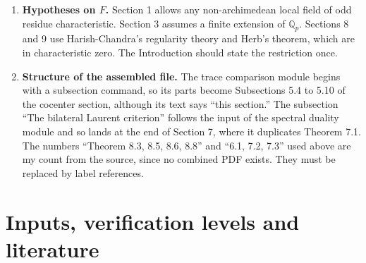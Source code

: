 \documentclass[12pt,letterpaper]{amsart}
\numberwithin{equation}{section}
\theoremstyle{definition}
\theoremstyle{remark}
\begin{document}
\begin{enumerate}[leftmargin=*]
\item \textbf{Hypotheses on $F$.} Section 1 allows any non-archimedean local field of odd residue characteristic. Section 3 assumes a finite extension of $\mathbb Q_p$. Sections 8 and 9 use Harish-Chandra's regularity theory and Herb's theorem, which are in characteristic zero. The Introduction should state the restriction once.
\item \textbf{Structure of the assembled file.} The trace comparison module begins with a subsection command, so its parts become Subsections 5.4 to 5.10 of the cocenter section, although its text says ``this section.'' The subsection ``The bilateral Laurent criterion'' follows the input of the spectral duality module and so lands at the end of Section 7, where it duplicates Theorem 7.1. The numbers ``Theorem 8.3, 8.5, 8.6, 8.8'' and ``6.1, 7.2, 7.3'' used above are my count from the source, since no combined PDF exists. They must be replaced by label references.
\end{enumerate}

\section{Inputs, verification levels and literature}
\end{document}
